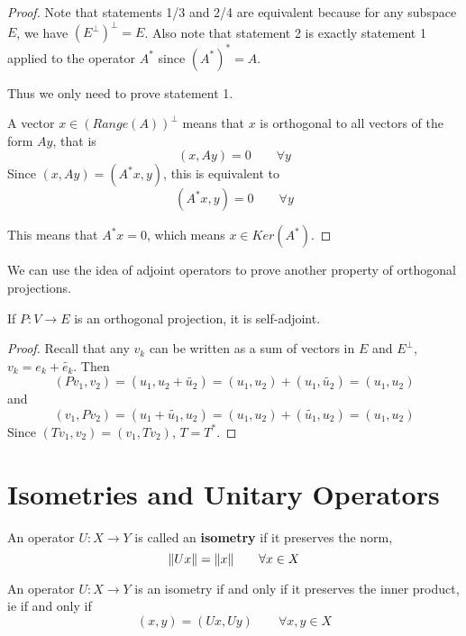 \begin{proof}
Note that statements 1/3 and 2/4 are equivalent because for any subspace $E$, we have $(E^{\perp})^{\perp} = E$. Also note that statement 2 is exactly statement 1 applied to the operator $A^{*}$ since $(A^{*})^{*} = A$. 

Thus we only need to prove statement 1. 

A vector $x \in (Range(A))^{\perp}$ means that $x$ is orthogonal to all vectors of the form $Ay$, that is 
$$(x, Ay) = 0 \qquad \forall y$$ 
Since $(x, Ay) = (A^{*}x, y)$, this is equivalent to 
$$(A^{*} x, y) = 0 \qquad \forall y$$

This means that $A^{*}x = 0$, which means $x \in Ker(A^{*})$. 
\end{proof}

We can use the idea of adjoint operators to prove another property of orthogonal projections. 

\begin{theorem}
If $P: V \rightarrow E$ is an orthogonal projection, it is self-adjoint. 
\end{theorem}

\begin{proof}
Recall that any $v_{k}$ can be written as a sum of vectors in $E$ and $E^{\perp}$, $v_{k} = e_{k} + \widetilde{e_{k}}$. Then
$$(Pv_{1}, v_{2}) = (u_{1}, u_{2} + \widetilde{u_{2}}) = (u_{1}, u_{2}) + (u_{1}, \widetilde{u_{2}}) = (u_{1}, u_{2})$$
and 
$$(v_{1}, Pv_{2}) = (u_{1} + \widetilde{u_{1}}, u_{2}) = (u_{1}, u_{2}) + (\widetilde{u_{1}}, u_{2}) = (u_{1}, u_{2})$$
Since $(Tv_{1}, v_{2}) = (v_{1}, Tv_{2})$, $T = T^{*}$. 
\end{proof}



\section{Isometries and Unitary Operators}
\begin{definition}
An operator $U: X \rightarrow Y$ is called an \textbf{isometry} if it preserves the norm, 
$$\norm{Ux} = \norm{x} \qquad \forall x \in X$$
\end{definition}

\begin{theorem}
An operator $U: X \rightarrow Y$ is an isometry if and only if it preserves the inner product, ie if and only if 
$$(x, y) = (Ux, Uy) \qquad \forall x, y \in X$$
\end{theorem}

